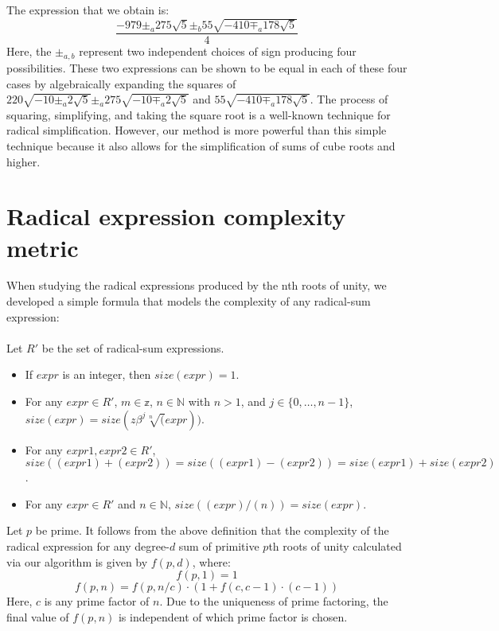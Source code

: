 \documentclass{article}
\begin{document}
        The expression that we obtain is:
        $$ \frac{-979 \pm_a 275 \sqrt{5} \pm_b 55 \sqrt{-410 \mp_a 178 \sqrt{5}}}{4} $$
        Here, the $ \pm_{a, b} $ represent two independent choices of sign producing four possibilities. These two expressions can be shown to be equal in each of these four cases by algebraically expanding the squares of $ 220 \sqrt{-10 \pm_a 2 \sqrt{5}} \pm_a 275 \sqrt{-10 \mp_a 2 \sqrt{5}} $ and $ 55 \sqrt{-410 \mp_a 178 \sqrt{5}} $. The process of squaring, simplifying, and taking the square root is a well-known technique for radical simplification. However, our method is more powerful than this simple technique because it also allows for the simplification of sums of cube roots and higher.\\
\section{Radical expression complexity metric}
    When studying the radical expressions produced by the nth roots of unity, we developed a simple formula that models the complexity of any radical-sum expression:\\
    \\
    Let $ R' $ be the set of radical-sum expressions.\\
    \begin{itemize}
        \item If $ expr $ is an integer, then $ size(expr) = 1 $.
        \item For any $ expr \in R' $, $ m \in \mathbb{z} $, $ n \in \mathbb{N} $ with $ n > 1 $, and $ j \in \{0, \dots, n - 1\} $, $ size(expr) = size(z\beta^j \sqrt[n](expr)) $.
        \item For any $ expr1, expr2 \in R' $, $ size((expr1) + (expr2)) = size((expr1) - (expr2)) = size(expr1) + size(expr2) $.
        \item For any $ expr \in R' $ and $ n \in \mathbb{N} $, $ size((expr)/(n)) = size(expr) $.
    \end{itemize}
    Let $ p $ be prime. It follows from the above definition that the complexity of the radical expression for any degree-$ d $ sum of primitive $ p $th roots of unity calculated via our algorithm is given by $ f(p, d) $, where:
    $$ f(p, 1) = 1 $$
    $$ f(p, n) = f(p, n/c) \cdot (1 + f(c, c - 1) \cdot (c - 1)) $$
    Here, $ c $ is any prime factor of $ n $. Due to the uniqueness of prime factoring, the final value of $ f(p, n) $ is independent of which prime factor is chosen.\\
\end{document}
